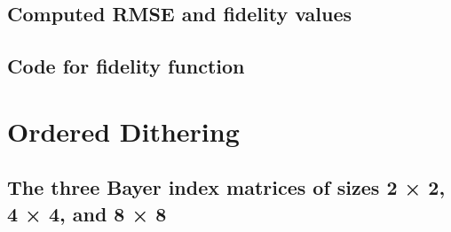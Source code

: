 \documentclass{article}
\begin{document}
\subsection{Computed RMSE and fidelity values}
\subsection{Code for fidelity function}


\section{Ordered Dithering}
\subsection{The three Bayer index matrices of sizes 2 × 2, 4 × 4, and 8 × 8}
\end{document}
